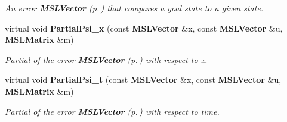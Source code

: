 \begin{CompactItemize}
\begin{CompactList}\small\item\em An error {\bf MSLVector} {\rm (p.\,\pageref{class_MSLVector})} that compares a goal state to a given state.\item\end{CompactList}\item 
virtual void {\bf Partial\-Psi\_\-x} (const {\bf MSLVector} \&x, const {\bf MSLVector} \&u, {\bf MSLMatrix} \&m)
\begin{CompactList}\small\item\em Partial of the error {\bf MSLVector} {\rm (p.\,\pageref{class_MSLVector})} with respect to x.\item\end{CompactList}\item 
virtual void {\bf Partial\-Psi\_\-t} (const {\bf MSLVector} \&x, const {\bf MSLVector} \&u, {\bf MSLMatrix} \&m)
\begin{CompactList}\small\item\em Partial of the error {\bf MSLVector} {\rm (p.\,\pageref{class_MSLVector})} with respect to time.\item\end{CompactList}\end{CompactItemize}
